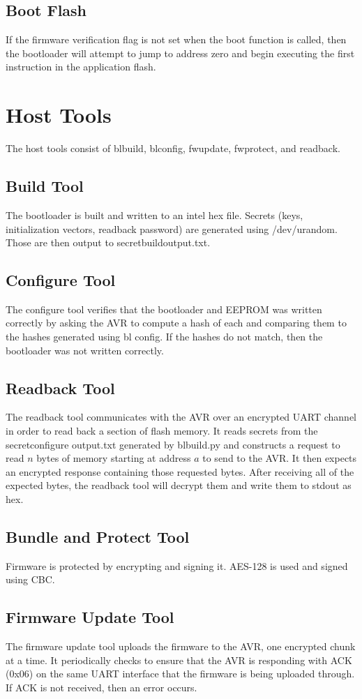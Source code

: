 \documentclass[11pt]{article}
\begin{document}
\subsection{Boot Flash}
If the firmware verification flag is not set when the boot function is called, then the bootloader will attempt to jump to address zero and begin executing the first instruction in the application flash.
\section{Host Tools}
The host tools consist of bl\textunderscore build, bl\textunderscore config, fw\textunderscore update, fw\textunderscore protect, and readback.
\subsection{Build Tool}
The bootloader is built and written to an intel hex file. Secrets (keys, initialization vectors, readback password) are generated using /dev/urandom. Those are then output to secret\textunderscore build\textunderscore output.txt.
\subsection{Configure Tool}
The configure tool verifies that the bootloader and EEPROM was written correctly by asking the AVR to compute a hash of each and comparing them to the hashes generated using bl \textunderscore config. If the hashes do not match, then the bootloader was not written correctly.
\subsection{Readback Tool}
The readback tool communicates with the AVR over an encrypted UART channel in order to read back a section of flash memory. It reads secrets from the secret\textunderscore configure \textunderscore output.txt generated by bl\textunderscore build.py and constructs a request to read $n$ bytes of memory starting at address $a$ to send to the AVR. It then expects an encrypted response containing those requested bytes. After receiving all of the expected bytes, the readback tool will decrypt them and write them to stdout as hex. 
\subsection{Bundle and Protect Tool}
Firmware is protected by encrypting and signing it. AES-128 is used and signed using CBC.
\subsection{Firmware Update Tool}
The firmware update tool uploads the firmware to the AVR, one encrypted chunk at a time. It periodically checks to ensure that the AVR is responding with ACK (0x06) on the same UART interface that the firmware is being uploaded through. If ACK is not received, then an error occurs.
\end{document}
